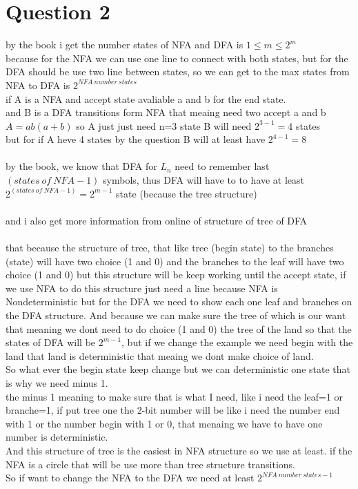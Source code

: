 \documentclass[12pt]{article}
\begin{document}
    \section*{Question 2}
    by the book i get the number states of NFA and DFA is $1\leq m\leq 2^m$\\
    because for the NFA we can use one line to connect with both states, but for the DFA should be use two line between states,
    so we can get to the max states from NFA to DFA is $2^{NFA~number~states}$ \\
    if A is a NFA and accept state avaliable  a and b for the end state.\\
    and B is a DFA transitions form NFA that meaing need two accept a and b\\
    $A=ab(a+b)$ so A just just need n=3 state B will need $2^{3-1}=4$ states\\
    but for if A heve 4 states by the question B will at least have $2^{4-1}=8$\\
    \\
    by the book, we know that DFA for $L_n$ need to remember last $\left(states~of~NFA-1\right)$ symbols, thus DFA will have to to have 
    at least $2^{\left(states~of~NFA-1\right)}=2^{m-1}$ state (because the tree structure)\\
    \\    
    and i also get more information from online of structure of tree of DFA\\
    \\
    that because the structure of tree, that like tree (begin state) to the branches (state) will have two choice (1 and 0) and the branches to the leaf will have two choice (1 and 0) 
    but this structure will be keep working until the accept state, if we use NFA to do this structure just need a line because NFA is Nondeterministic but for the DFA we need to show 
    each one leaf and branches on the DFA structure. And because we can make sure the tree of which is our want that meaning we dont need to do choice (1 and 0) the tree of the land 
    so that the states of DFA will be $2^{m-1}$, but if we change the example we need begin with the land that land is deterministic that meaing we dont make choice of land.\\
    So what ever the begin state keep change but we can deterministic one state that is why we need minus 1.\\
    the minus 1 meaning to make sure that is what I need, like i need the leaf=1 or branche=1, if put tree one the 2-bit number will be like i need the number end with 1 or the number 
    begin with 1 or 0, that menaing we have to have one number is deterministic.\\
    And this structure of tree is the easiest in NFA structure so we use at least. if the NFA is a circle that will be use more than tree structure transitions.\\
    So if want to change the NFA to the DFA we need at least $2^{NFA~number~states-1}$\\
\end{document}
